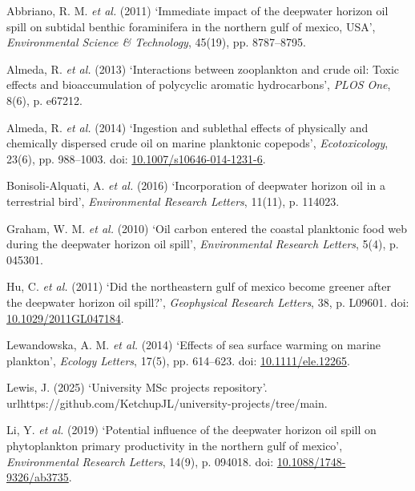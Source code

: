 \documentclass[
  11pt,
]{article}
\newlength{\cslhangindent}
\newenvironment{CSLReferences}[2] %
 {\begin{list}{}{%
  \setlength{\itemindent}{0pt}
  \setlength{\leftmargin}{0pt}
  \setlength{\parsep}{0pt}
  \ifodd #1
   \setlength{\leftmargin}{\cslhangindent}
   \setlength{\itemindent}{-1\cslhangindent}
  \fi
  \setlength{\itemsep}{#2\baselineskip}}}
 {\end{list}}
\begin{document}
\label{refs}
\begin{CSLReferences}{0}{1}
Abbriano, R. M. \emph{et al.} (2011) {`Immediate impact of the deepwater
horizon oil spill on subtidal benthic foraminifera in the northern gulf
of mexico, USA'}, \emph{Environmental Science \& Technology}, 45(19),
pp. 8787--8795.

Almeda, R. \emph{et al.} (2013) {`Interactions between zooplankton and
crude oil: Toxic effects and bioaccumulation of polycyclic aromatic
hydrocarbons'}, \emph{PLOS One}, 8(6), p. e67212.

Almeda, R. \emph{et al.} (2014) {`Ingestion and sublethal effects of
physically and chemically dispersed crude oil on marine planktonic
copepods'}, \emph{Ecotoxicology}, 23(6), pp. 988--1003. doi:
\href{https://doi.org/10.1007/s10646-014-1231-6}{10.1007/s10646-014-1231-6}.

Bonisoli-Alquati, A. \emph{et al.} (2016) {`Incorporation of deepwater
horizon oil in a terrestrial bird'}, \emph{Environmental Research
Letters}, 11(11), p. 114023.

Graham, W. M. \emph{et al.} (2010) {`Oil carbon entered the coastal
planktonic food web during the deepwater horizon oil spill'},
\emph{Environmental Research Letters}, 5(4), p. 045301.

Hu, C. \emph{et al.} (2011) {`Did the northeastern gulf of mexico become
greener after the deepwater horizon oil spill?'}, \emph{Geophysical
Research Letters}, 38, p. L09601. doi:
\href{https://doi.org/10.1029/2011GL047184}{10.1029/2011GL047184}.

Lewandowska, A. M. \emph{et al.} (2014) {`Effects of sea surface warming
on marine plankton'}, \emph{Ecology Letters}, 17(5), pp. 614--623. doi:
\href{https://doi.org/10.1111/ele.12265}{10.1111/ele.12265}.

Lewis, J. (2025) {`University MSc projects repository'}.\\
url{https://github.com/KetchupJL/university-projects/tree/main}.

Li, Y. \emph{et al.} (2019) {`Potential influence of the deepwater
horizon oil spill on phytoplankton primary productivity in the northern
gulf of mexico'}, \emph{Environmental Research Letters}, 14(9), p.
094018. doi:
\href{https://doi.org/10.1088/1748-9326/ab3735}{10.1088/1748-9326/ab3735}.


\end{CSLReferences}
\end{document}
